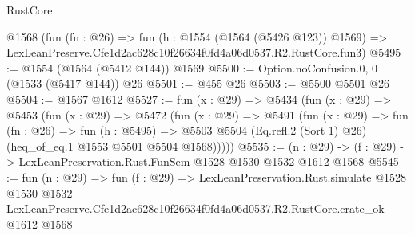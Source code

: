 \begin{lexlean}{RustCore}
\begin{coremodule}
    @1568
    (fun (fn : @26) =>
    fun (h : @1554 (@1564 (@5426 @123)) @1569) =>
    LexLeanPreserve.Cfe1d2ac628c10f26634f0fd4a06d0537.R2.RustCore.fun3)
@5495 := @1554 (@1564 (@5412 @144)) @1569
@5500 := Option.noConfusion.{0, 0} (@1533 (@5417 @144)) @26
@5501 := @455 @26
@5503 := @5500 @5501 @26
@5504 := @1567 @1612
@5527 := fun (x : @29) =>
  @5434
    (fun (x : @29) =>
    @5453
      (fun (x : @29) =>
      @5472
        (fun (x : @29) =>
        @5491
          (fun (x : @29) =>
          fun (fn : @26) =>
          fun (h : @5495) =>
          @5503 @5504 (Eq.refl.{2} (Sort 1) @26) (heq_of_eq.{1} @1553 @5501 @5504 @1568)))))
@5535 := (n : @29) -> (f : @29) -> LexLeanPreservation.Rust.FunSem @1528 @1530 @1532 @1612 @1568
@5545 := fun (n : @29) =>
  fun (f : @29) =>
  LexLeanPreservation.Rust.simulate
    @1528
    @1530
    @1532
    LexLeanPreserve.Cfe1d2ac628c10f26634f0fd4a06d0537.R2.RustCore.crate_ok
    @1612
    @1568
\end{coremodule}
\end{lexlean}
